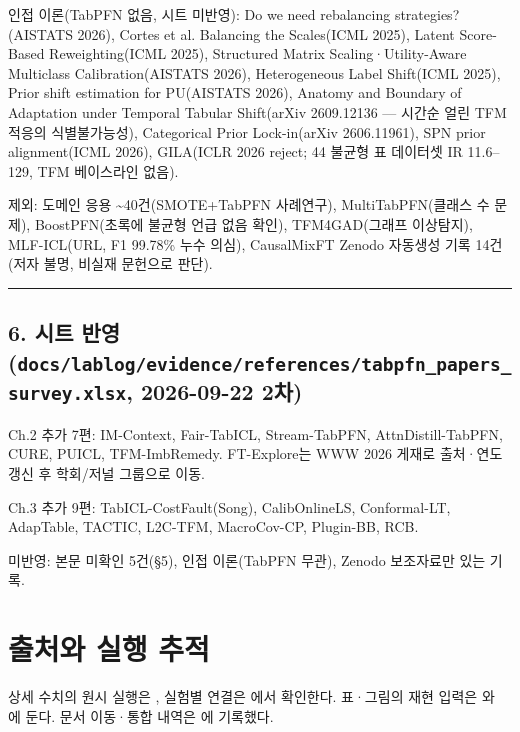 \par\noindent \textbullet\enspace 인접 이론(TabPFN 없음, 시트 미반영): Do we need rebalancing strategies?(AISTATS 2026), Cortes et al. Balancing the Scales(ICML 2025), Latent Score-Based Reweighting(ICML 2025), Structured Matrix Scaling·Utility-Aware Multiclass Calibration(AISTATS 2026), Heterogeneous Label Shift(ICML 2025), Prior shift estimation for PU(AISTATS 2026), Anatomy and Boundary of Adaptation under Temporal Tabular Shift(arXiv 2609.12136 — 시간순 얼린 TFM 적응의 식별불가능성), Categorical Prior Lock-in(arXiv 2606.11961), SPN prior alignment(ICML 2026), GILA(ICLR 2026 reject; 44 불균형 표 데이터셋 IR 11.6–129, TFM 베이스라인 없음).


\par\noindent \textbullet\enspace 제외: 도메인 응용 \textasciitilde{}40건(SMOTE+\allowbreak{}TabPFN 사례연구), MultiTabPFN(클래스 수 문제), BoostPFN(초록에 불균형 언급 없음 확인), TFM4GAD(그래프 이상탐지), MLF-ICL(URL, F1 99.78\% 누수 의심), CausalMixFT Zenodo 자동생성 기록 14건(저자 불명, 비실재 문헌으로 판단).



\medskip\hrule\medskip
\subsection{6. 시트 반영 (\texttt{docs/\allowbreak{}\allowbreak{}lab\allowbreak{}log/\allowbreak{}\allowbreak{}evid\allowbreak{}ence/\allowbreak{}\allowbreak{}ref\allowbreak{}erences/\allowbreak{}\allowbreak{}tabpfn\_\allowbreak{}\allowbreak{}p\allowbreak{}apers\_\allowbreak{}\allowbreak{}su\allowbreak{}rvey.\allowbreak{}xls\allowbreak{}x}, 2026-09-22 2차)}
\par\noindent \textbullet\enspace Ch.2 추가 7편: IM-Context, Fair-TabICL, Stream-TabPFN, AttnDistill-TabPFN, CURE, PUICL, TFM-ImbRemedy. FT-Explore는 WWW 2026 게재로 출처·연도 갱신 후 학회/\allowbreak{}저널 그룹으로 이동.


\par\noindent \textbullet\enspace Ch.3 추가 9편: TabICL-CostFault(Song), CalibOnlineLS, Conformal-LT, AdapTable, TACTIC, L2C-TFM, MacroCov-CP, Plugin-BB, RCB.


\par\noindent \textbullet\enspace 미반영: 본문 미확인 5건(§5), 인접 이론(TabPFN 무관), Zenodo 보조자료만 있는 기록.




\section*{출처와 실행 추적}

상세 수치의 원시 실행은 , 실험별 연결은 에서 확인한다. 표·그림의 재현 입력은 와 에 둔다. 문서 이동·통합 내역은 에 기록했다.


